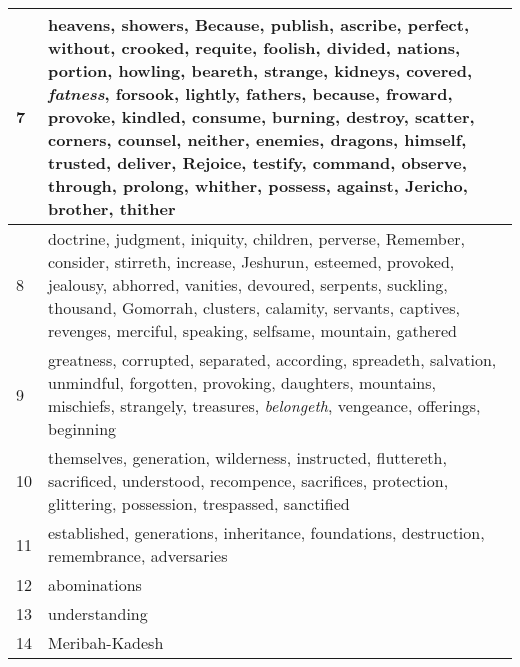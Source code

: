 \begin{longtable}{l|p{3.75in}}
7 & heavens, showers, Because, publish, ascribe, perfect, without, crooked, requite, foolish, divided, nations, portion, howling, beareth, strange, kidneys, covered, \emph{fatness}, forsook, lightly, fathers, because, froward, provoke, kindled, consume, burning, destroy, scatter, corners, counsel, neither, enemies, dragons, himself, trusted, deliver, Rejoice, testify, command, observe, through, prolong, whither, possess, against, Jericho, brother, thither \\ \hline
8 & doctrine, judgment, iniquity, children, perverse, Remember, consider, stirreth, increase, Jeshurun, esteemed, provoked, jealousy, abhorred, vanities, devoured, serpents, suckling, thousand, Gomorrah, clusters, calamity, servants, captives, revenges, merciful, speaking, selfsame, mountain, gathered \\ \hline
9 & greatness, corrupted, separated, according, spreadeth, salvation, unmindful, forgotten, provoking, daughters, mountains, mischiefs, strangely, treasures, \emph{belongeth}, vengeance, offerings, beginning \\ \hline
10 & themselves, generation, wilderness, instructed, fluttereth, sacrificed, understood, recompence, sacrifices, protection, glittering, possession, trespassed, sanctified \\ \hline
11 & established, generations, inheritance, foundations, destruction, remembrance, adversaries \\ \hline
12 & abominations \\ \hline
13 & understanding \\ \hline
14 & Meribah-Kadesh \\ \hline
\end{longtable}






 



